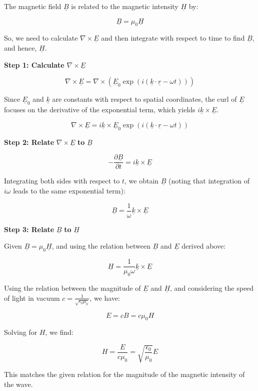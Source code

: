 The magnetic field \(\underline{B}\) is related to the magnetic intensity \(\underline{H}\) by:

\[
\underline{B} = \mu_{0} \underline{H}
\]

So, we need to calculate \(\nabla \times \underline{E}\) and then integrate with respect to time to find \(\underline{B}\), and hence, \(\underline{H}\).

\textbf{Step 1: Calculate} \(\nabla \times \underline{E}\)

\[
\nabla \times \underline{E} = \nabla \times (\underline{E}_{0} \exp(i(\underline{k} \cdot \underline{r} - \omega t)))
\]

Since \(\underline{E}_{0}\) and \(\underline{k}\) are constants with respect to spatial coordinates, the curl of \(\underline{E}\) focuses on the derivative of the exponential term, which yields \(i\underline{k} \times \underline{E}\).

\[
\nabla \times \underline{E} = i\underline{k} \times \underline{E}_{0} \exp(i(\underline{k} \cdot \underline{r} - \omega t))
\]

\textbf{Step 2: Relate} \(\nabla \times \underline{E}\) \textbf{to} \(\underline{B}\)

\[
- \frac{\partial \underline{B}}{\partial t} = i\underline{k} \times \underline{E}
\]

Integrating both sides with respect to \(t\), we obtain \(\underline{B}\) (noting that integration of \(i\omega\) leads to the same exponential term):

\[
\underline{B} = \frac{1}{\omega} \underline{k} \times \underline{E}
\]

\textbf{Step 3: Relate} \(\underline{B}\) \textbf{to} \(\underline{H}\)

Given \(\underline{B} = \mu_{0} \underline{H}\), and using the relation between \(\underline{B}\) and \(\underline{E}\) derived above:

\[
\underline{H} = \frac{1}{\mu_{0}\omega} \underline{k} \times \underline{E}
\]

Using the relation between the magnitude of \(\underline{E}\) and \(\underline{H}\), and considering the speed of light in vacuum \(c = \frac{1}{\sqrt{\epsilon_{0}\mu_{0}}}\), we have:

\[
E = cB = c\mu_{0}H
\]

Solving for \(H\), we find:

\[
H = \frac{E}{c\mu_{0}} = \sqrt{\frac{\epsilon_{0}}{\mu_{0}}} E
\]

This matches the given relation for the magnitude of the magnetic intensity of the wave.

